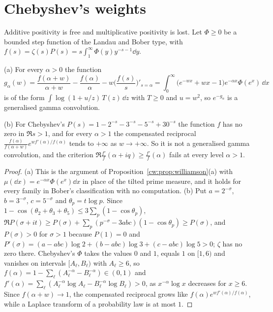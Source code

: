 \section{Chebyshev's weights}\label{cw:sec:weights}

Additive positivity is free and multiplicative positivity is lost. Let $\Phi\ge0$ be a bounded step function of the Landau and Bober type, with $f(s)=\zeta(s)P(s)=s\int_1^\infty\Phi(y)y^{-s-1}\dd y$.

\begin{proposition}\label{cw:prop:chebw}
(a) For every $\alpha>0$ the function
\[
g_\alpha(w)=\frac{f(\alpha+w)}{\alpha+w}-\frac{f(\alpha)}{\alpha}-w\Big(\frac{f(s)}{s}\Big)'_{s=\alpha}
=\int_0^\infty\big(e^{-wx}+wx-1\big)e^{-\alpha x}\Phi(e^x)\,\dd x
\]
is of the form $\int\log(1+u/z)\,T(z)\,\dd z$ with $T\ge0$ and $u=w^2$, so $e^{-g_\alpha}$ is a generalised gamma convolution.

(b) For Chebyshev's $P(s)=1-2^{-s}-3^{-s}-5^{-s}+30^{-s}$ the function $f$ has no zero in $\Re s>1$, and for every $\alpha>1$ the compensated reciprocal $\frac{f(\alpha)}{f(\alpha+w)}e^{wf'(\alpha)/f(\alpha)}$ tends to $+\infty$ as $w\to+\infty$. So it is not a generalised gamma convolution, and the criterion $\Re\frac{f'}{f}(\alpha+iq)\ge\frac{f'}{f}(\alpha)$ fails at every level $\alpha>1$.
\end{proposition}

\begin{proof}
(a) This is the argument of Proposition~\ref{cw:prop:williamson}(a) with $\mu(\dd x)=e^{-\alpha x}\Phi(e^x)\dd x$ in place of the tilted prime measure, and it holds for every family in Bober's classification with no computation. (b) Put $a=2^{-\sigma}$, $b=3^{-\sigma}$, $c=5^{-\sigma}$ and $\theta_p=t\log p$. Since $1-\cos(\theta_2+\theta_3+\theta_5)\le3\sum_p(1-\cos\theta_p)$, $\Re P(\sigma+it)\ge P(\sigma)+\sum_p(p^{-\sigma}-3abc)(1-\cos\theta_p)\ge P(\sigma)$, and $P(\sigma)>0$ for $\sigma>1$ because $P(1)=0$ and $P'(\sigma)=(a-abc)\log2+(b-abc)\log3+(c-abc)\log5>0$; $\zeta$ has no zero there. Chebyshev's $\Phi$ takes the values $0$ and $1$, equals $1$ on $[1,6)$ and vanishes on intervals $[A_\ell,B_\ell)$ with $A_\ell\ge6$, so $f(\alpha)=1-\sum_\ell(A_\ell^{-\alpha}-B_\ell^{-\alpha})\in(0,1)$ and $f'(\alpha)=\sum_\ell(A_\ell^{-\alpha}\log A_\ell-B_\ell^{-\alpha}\log B_\ell)>0$, as $x^{-\alpha}\log x$ decreases for $x\ge6$. Since $f(\alpha+w)\to1$, the compensated reciprocal grows like $f(\alpha)e^{wf'(\alpha)/f(\alpha)}$, while a Laplace transform of a probability law is at most $1$.
\end{proof}

